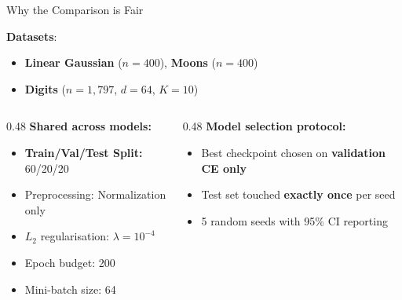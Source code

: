 \documentclass[11pt,aspectratio=169]{beamer}
\begin{document}
\begin{frame}{Why the Comparison is Fair}

\textbf{Datasets}: 
\begin{itemize}
    \item \textbf{Linear Gaussian} ($n{=}400$), \textbf{Moons} ($n{=}400$)
    \item \textbf{Digits} ($n{=}1{,}797$, $d{=}64$, $K{=}10$)
\end{itemize}

\vspace{0.1em}
\begin{columns}[T]
\begin{column}{0.48\textwidth}
\textbf{Shared across models:}
\begin{itemize}
    \item \textbf{Train/Val/Test Split:} 60/20/20
    \item Preprocessing: Normalization only
    \item $L_2$ regularisation: $\lambda = 10^{-4}$
    \item Epoch budget: 200
    \item Mini-batch size: 64
\end{itemize}
\end{column}
\begin{column}{0.48\textwidth}
\textbf{Model selection protocol:}
\begin{itemize}
    \item Best checkpoint chosen on \textbf{validation CE only}
    \item Test set touched \textbf{exactly once} per seed
    \item 5 random seeds with 95\% CI reporting
\end{itemize}
\end{column}
\end{columns}

\end{frame}
\end{document}
